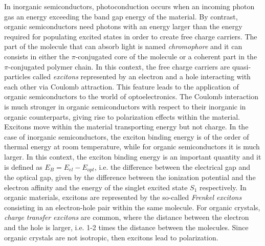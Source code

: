 \documentclass  [
  paper    = a4,
  BCOR     = 10mm,
  twoside,
  fontsize = 12pt,
  fleqn,
  toc      = bibnumbered,
  toc      = listofnumbered,
  numbers  = noendperiod,
  headings = normal,
  listof   = leveldown,
  version  = 3.03
]                                       {scrreprt}
\begin{document}
In inorganic semiconductors, photoconduction occurs when an incoming photon gas an energy exceeding the band gap energy of the material. By contrast, organic semiconductors need photons with an energy larger than the energy required for populating excited states in order to create free charge carriers. The part of the molecule that can absorb light is named \emph{chromophore} and it can consists in either the $\pi$-conjugated core of the molecule or a coherent part in the $\pi$-conjugated polymer chain. In this context, the free charge carriers are quasi-particles called \emph{excitons} represented by an electron and a hole interacting with each other via Coulomb attraction. This feature leads to the application of organic semiconductors to the world of optoelectronics. The Coulomb interaction is much stronger in organic semiconductors with respect to their inorganic in organic counterparts, giving rise to polarization effects within the material. Excitons move within the material transporting energy but not charge. In the case of inorganic semiconductors, the exciton binding energy is of the order of thermal energy at room temperature, while for organic semiconductors it is much larger. In this context, the exciton binding energy is an important quantity and it is defined as $E_B=E_{el}-E_{opt}$, i.e. the difference between the electrical gap and the optical gap, given by the difference between the ionization potential and the electron affinity and the energy of the singlet excited state $S_1$ respectively. In organic materials, excitons are represented by the so-called \emph{Frenkel excitons} consisting in an electron-hole pair within the same molecule. For organic crystals, \emph{charge transfer excitons} are common, where the distance between the electron and the hole is larger, i.e. 1-2 times the distance between the molecules. Since organic crystals are not isotropic, then excitons lead to polarization.\\ 
\end{document}
